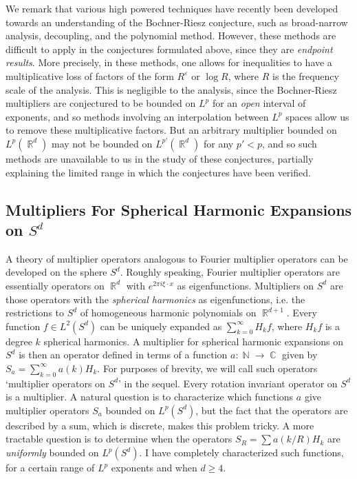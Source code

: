 \documentclass[11pt]{article}
\DeclareMathOperator{\RR}{\mathbb{R}}
\DeclareMathOperator{\NN}{\mathbb{N}}
\DeclareMathOperator{\CC}{\mathbb{C}}
\begin{document}
We remark that various high powered techniques have recently been developed towards an understanding of the Bochner-Riesz conjecture, such as broad-narrow analysis, decoupling, and the polynomial method. However, these methods are difficult to apply in the conjectures formulated above, since they are \emph{endpoint results}. More precisely, in these methods, one allows for inequalities to have a multiplicative loss of factors of the form $R^\varepsilon$ or $\log R$, where $R$ is the frequency scale of the analysis. This is negligible to the analysis, since the Bochner-Riesz multipliers are conjectured to be bounded on $L^p$ for an \emph{open} interval of exponents, and so methods involving an interpolation between $L^p$ spaces allow us to remove these multiplicative factors. But an arbitrary multiplier bounded on $L^p(\RR^d)$ may not be bounded on $L^{p'}(\RR^d)$ for any $p' < p$, and so such methods are unavailable to us in the study of these conjectures, partially explaining the limited range in which the conjectures have been verified.

\subsection{Multipliers For Spherical Harmonic Expansions on $S^d$}

A theory of multiplier operators analogous to Fourier multiplier operators can be developed on the sphere $S^d$. Roughly speaking, Fourier multiplier operators are essentially operators on $\RR^d$ with $e^{2 \pi i \xi \cdot x}$ as eigenfunctions. Multipliers on $S^d$ are those operators with the \emph{spherical harmonics} as eigenfunctions, i.e. the restrictions to $S^d$ of homogeneous harmonic polynomials on $\RR^{d+1}$. Every function $f \in L^2(S^d)$ can be uniquely expanded as $\sum_{k = 0}^\infty H_k f$, where $H_k f$ is a degree $k$ spherical harmonics. A multiplier for spherical harmonic expansions on $S^d$ is then an operator defined in terms of a function $a: \NN \to \CC$ given by $S_a = \sum_{k = 0}^\infty a(k) H_k$.
%
%
For purposes of brevity, we will call such operators `multiplier operators on $S^d$' in the sequel. Every rotation invariant operator on $S^d$ is a multiplier. %
A natural question is to characterize which functions $a$ give multiplier operators $S_a$ bounded on $L^p(S^d)$, but the fact that the operators are described by a sum, which is discrete, makes this problem tricky. A more tractable question is to determine when the operators $S_R = \sum a(k/R) H_k$ are \emph{uniformly} bounded on $L^p(S^d)$. I have completely characterized such functions, for a certain range of $L^p$ exponents and when $d \geq 4$.
\end{document}
